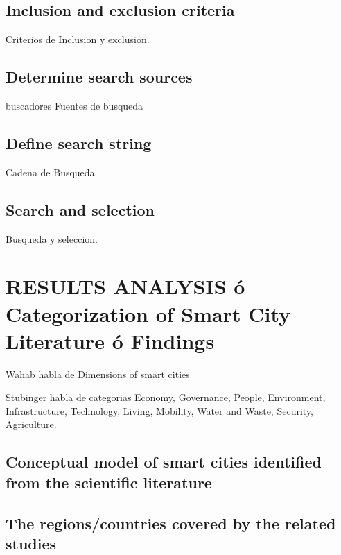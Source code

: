 \documentclass[a4paper,fleqn,spanish]{cas-dc}
\begin{document}
{{\subsection{Inclusion and exclusion criteria}\label{criterio}

Criterios de Inclusion y exclusion.

\subsection{Determine search sources}\label{fuentes}

buscadores
 Fuentes de busqueda


\subsection{Define search string}\label{cadena}

Cadena de Busqueda.


\subsection{Search and selection}\label{seleccion}

Busqueda y seleccion.


\section{RESULTS ANALYSIS ó Categorization of Smart City Literature ó
Findings}\label{resultados}

Wahab habla de Dimensions of smart cities \cite{wahab_systematic_2020}

Stubinger habla de categorias \cite{stubinger_understanding_2020}
 Economy,
Governance,
 People,
 Environment,
 Infrastructure,
 Technology,
 Living,
Mobility,
 Water and Waste,
 Security, 
 Agriculture.


\subsection{Conceptual model of smart cities identified from the scientific
literature}\label{sci-lit}


\subsection{The regions/countries covered by the related
studies}\label{regiones}



}}
\end{document}
